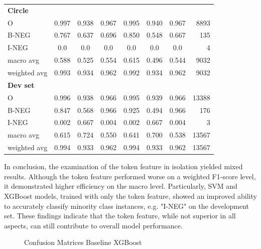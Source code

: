 \begin{table}[!ht]
\begin{tabular}{lccc|cccr}
\hline
\textbf{Circle}    &        &        &        &       &       &       &   \\
O                  &  0.997 &  0.938 &  0.967 & 0.995 & 0.940 & 0.967 & 8893 \\
B-NEG              &  0.767 &  0.637 &  0.696 & 0.850 & 0.548 & 0.667 & 135 \\
I-NEG              &    0.0 &    0.0 &    0.0 &  0.0  & 0.0   &   0.0 & 4 \\
macro avg          &  0.588 &  0.525 &  0.554 & 0.615 & 0.496 & 0.544 & 9032 \\
weighted avg       &  0.993 &  0.934 &  0.962 & 0.992 & 0.934 & 0.962 & 9032 \\
\hline
\textbf{Dev set}   &        &        &        &       &       & &   \\
O                  &  0.996 &  0.938 &  0.966 & 0.995 & 0.939 & 0.966 & 13388 \\
B-NEG              &  0.847 &  0.568 &  0.966 & 0.925 & 0.494 & 0.966 & 176 \\
I-NEG              &  0.002 &  0.667 &  0.004 & 0.002 & 0.667 & 0.004 & 3 \\
macro avg          &  0.615 &  0.724 &  0.550 & 0.641 & 0.700 & 0.538 & 13567 \\
weighted avg       &  0.994 &  0.933 &  0.962 & 0.994 & 0.933 & 0.962 & 13567 \\
\hline
\end{tabular}
\end{table}


In conclusion, the examination of the token feature in isolation yielded mixed results. Although the token feature performed worse on a weighted F1-score level, it demonstrated higher efficiency on the macro level. Particularly, SVM and XGBoost models, trained with only the token feature, showed an improved ability to accurately classify minority class instances, e.g. "I-NEG" on the development set. These findings indicate that the token feature, while not superior in all aspects, can still contribute to overall model performance.




\begin{figure}[!h]
\centering
  \caption{Confusion Matrices Baseline XGBoost}
  \label{fig:base_line_xgb}
\end{figure}


\FloatBarrier



